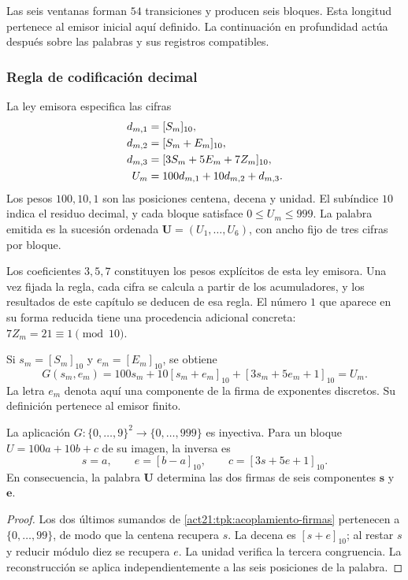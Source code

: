 Las seis ventanas forman \(54\) transiciones y producen seis bloques.
Esta longitud pertenece al emisor inicial aquí definido. La continuación
en profundidad actúa después sobre las palabras y sus registros compatibles.

\subsubsection{Regla de codificación decimal}

La ley emisora especifica las cifras
\begin{align}
 d_{m,1}&=[S_m]_{10},\notag\\
 d_{m,2}&=[S_m+E_m]_{10},\notag\\
 d_{m,3}&=[3S_m+5E_m+7Z_m]_{10},\notag\\
 U_m&=100d_{m,1}+10d_{m,2}+d_{m,3}.
 \label{act21:tpk:bloque-decimal}
\end{align}
Los pesos \(100,10,1\) son las posiciones centena, decena y unidad.
El subíndice \(10\) indica el residuo decimal, y cada bloque satisface
\(0\leq U_m\leq999\). La palabra emitida es la sucesión ordenada
\(\mathbf U=(U_1,\ldots,U_6)\), con ancho fijo de tres cifras por bloque.

Los coeficientes \(3,5,7\) constituyen los pesos explícitos de esta ley
emisora. Una vez fijada la regla, cada cifra se calcula a partir de los
acumuladores, y los resultados de este capítulo se deducen de esa regla.
El número \(1\) que aparece en su forma reducida tiene una procedencia
adicional concreta: \(7Z_m=21\equiv1\pmod{10}\).

Si \(s_m=[S_m]_{10}\) y \(e_m=[E_m]_{10}\), se obtiene
\begin{equation}
 G(s_m,e_m)=100s_m+10[s_m+e_m]_{10}
                   +[3s_m+5e_m+1]_{10}=U_m.
 \label{act21:tpk:acoplamiento-firmas}
\end{equation}
La letra \(e_m\) denota aquí una componente de la firma de exponentes
discretos. Su definición pertenece al emisor finito.

\begin{proposition}
\label{act21:tpk:recuperacion-firmas}
La aplicación \(G:\{0,\ldots,9\}^2\to\{0,\ldots,999\}\) es inyectiva.
Para un bloque \(U=100a+10b+c\) de su imagen, la inversa es
\[
 s=a,\qquad e=[b-a]_{10},\qquad
 c=[3s+5e+1]_{10}.
\]
En consecuencia, la palabra \(\mathbf U\) determina las dos firmas de
seis componentes \(\mathbf s\) y \(\mathbf e\).
\end{proposition}
\begin{proof}
Los dos últimos sumandos de \eqref{act21:tpk:acoplamiento-firmas} pertenecen a
\(\{0,\ldots,99\}\), de modo que la centena recupera \(s\). La decena
es \([s+e]_{10}\); al restar \(s\) y reducir módulo diez se recupera
\(e\). La unidad verifica la tercera congruencia. La reconstrucción se
aplica independientemente a las seis posiciones de la palabra.
\end{proof}


